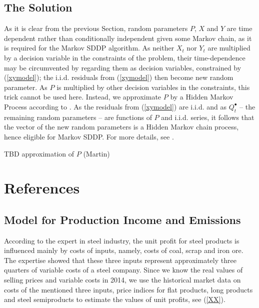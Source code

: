 \documentclass[3p,times]{elsarticle}
\begin{document}
\subsection{The Solution}


As it is clear from the previous Section, random parameters $P$, $X$ and $Y$ are time dependent rather than conditionally independent given some Markov chain, as it is required for the Markov SDDP algorithm. As neither $X_t$ nor  $Y_t$ are multiplied by a decision variable in the constraints of the problem, their time-dependence may be circumvented by regarding them as decision variables, constrained by (\ref{xymodel}); the i.i.d. residuals from (\ref{xymodel}) then become new random parameter. As $P$ is multiplied by other decision variables in the constraints, this trick cannot be used here. Instead, we approximate $P$ by a Hidden Markov Process according to  \citep{smid2019solution}. As the residuals from (\ref{xymodel}) are i.i.d. and as  $Q^\bullet_t$ -- the remaining random parameters -- are functions of $P$ and i.i.d. series, it follows that the vector of the new random parameters is a Hidden Markov chain process, hence eligible for Markov SDDP. For more details, see \citet{smid2019solution}.

TBD approximation of $P$ (Martin)


\section*{References}



\appendix

\def\indep{\perp\hspace{-2mm}\perp}
\def\E{\mathbb{E}}
\def\var{\mathrm{var}}
\newtheorem{lemma}{Lemma}

\subsection{Model for Production Income and Emissions}

According to the expert in steel industry, the unit profit for steel products is influenced mainly by costs of inputs, namely, costs of coal, scrap and iron ore. The expertise showed that these three inputs represent approximately three quarters of variable costs of a steel company. Since we know the real values of selling prices and variable costs in 2014, we use the historical market data on costs of the mentioned three inputs, price indices for flat products, long products and steel semiproducts to estimate the values of unit profits, see (\ref{XX}).
\end{document}
